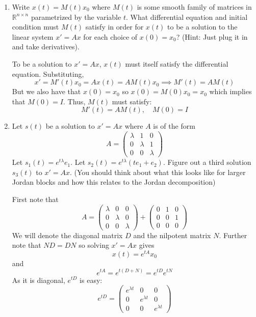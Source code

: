 \documentclass[12pt]{article}
\newcommand{\R}{\mathbb{R}}
\begin{document}
\begin{enumerate}
\pagebreak
\item Write $x(t) = M(t)x_{0}$ where $M(t)$ is some smooth family of matrices in $\R^{n\times n}$ parametrized by the variable $t$.  What differential equation and initial condition must $M(t)$ satisfy in order for $x(t)$ to be a solution to the linear system $x' = Ax$ for each choice of $x(0) = x_{0}$?  (Hint:  Just plug it in and take derivatives). 

    \color{blue}
        To be a solution to $x' = Ax$, $x(t)$ must itself satisfy the differential equation.  Substituting, 
        \[x' = M'(t)x_0 = Ax(t) = AM(t)x_0 \implies M'(t) = AM(t)\]
        But we also have that $x(0) = x_0$ so $x(0) = M(0)x_0 = x_0$ which implies that $M(0) = I$. Thus, $M(t)$ must satisfy: 
        \[\boxed{M'(t)= AM(t), \quad M(0) = I}\]
    \color{black}

\pagebreak
\item  Let $s(t)$ be a solution to $x' = Ax$ where $A$ is of the form
\[
    A = \left(\begin{array}{ccccc}
    \lambda & 1 & 0 \\
    0 & \lambda & 1 \\
    0 & 0 & \lambda
    \end{array}
    \right)
\]
Let $s_{1}(t) = e^{t\lambda}e_{1}$.  Let $s_{2}(t) = e^{t\lambda}\left(te_{1}+e_{2}\right)$.  Figure out a third solution $s_{3}(t)$ to $x' = Ax$.  (You should think about what this looks like for larger Jordan blocks and how this relates to the Jordan decomposition)

    \color{blue}
        First note that 
        \[A = \begin{pmatrix}
            \lambda & 0 & 0\\ 
            0 & \lambda & 0\\ 
            0 & 0 & \lambda
        \end{pmatrix} + \begin{pmatrix}
            0 & 1 & 0\\ 
            0 & 0 & 1\\ 
            0 & 0 & 0
        \end{pmatrix}\]
        We will denote the diagonal matrix $D$ and the nilpotent matrix $N$. Further note that $ND = DN$ so solving $x' = Ax$ gives 
        \[x(t) = e^{tA}x_0\]
        and 
        \[e^{tA} = e^{t(D + N)} = e^{tD}e^{tN}\] 
        As it is diagonal, $e^{tD}$ is easy:
        \[e^{tD} = \begin{pmatrix}
            e^{\lambda t} & 0 & 0\\ 
            0 & e^{\lambda t} & 0\\ 
            0 & 0 & e^{\lambda t}
        \end{pmatrix}\]


\end{enumerate}
\end{document}
